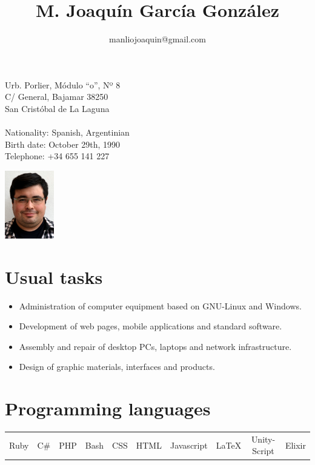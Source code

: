 \documentclass[10pt]{article}
\title{\bfseries M. Joaquín García González}
\author{manliojoaquin@gmail.com}
\date{}
\begin{document}

    \maketitle

    \begin{minipage}[ht]{0.48\textwidth}
        Urb. Porlier, Módulo ``o'', Nº 8\\
        C/ General, Bajamar 38250\\
        San Cristóbal de La Laguna\\
        \\
        Nationality: Spanish, Argentinian\\
        Birth date: October 29th, 1990\\
        Telephone: +34 655 141 227
    \end{minipage}
    \begin{minipage}[ht]{0.48\textwidth}
        \begin{flushright}
        \includegraphics[height=8em]{profile}
        \end{flushright}
    \end{minipage}

    \section*{Usual tasks}
    \begin{itemize}
        \item Administration of computer equipment based on GNU-Linux and Windows.

        \item Development of web pages, mobile applications and standard software.

        \item Assembly and repair of desktop PCs, laptops and network infrastructure.

        \item Design of graphic materials, interfaces and products.
    \end{itemize}

    \section*{Programming languages}
    \begin{center}
    \begin{tabular}{ c c c c c c c c c c }

        Ruby & C\# & PHP & Bash & CSS & HTML & Javascript & \LaTeX & Unity-Script & Elixir

    \end{tabular}
    \end{center}
\end{document}
